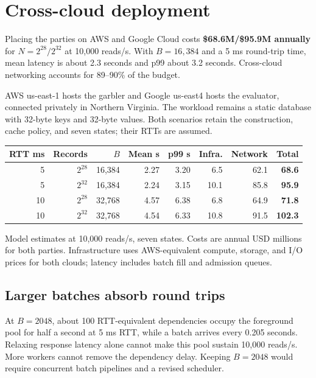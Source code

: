 \documentclass[11pt]{article}
\begin{document}
\clearpage
\section{Cross-cloud deployment}\label{sec:cross-cloud}
Placing the parties on AWS and Google Cloud costs \textbf{\$68.6M/\$95.9M annually} for $N=2^{28}/2^{32}$ at 10,000 reads/s. With $B=16{,}384$ and a 5 ms round-trip time, mean latency is about 2.3 seconds and p99 about 3.2 seconds. Cross-cloud networking accounts for 89--90\% of the budget.

AWS us-east-1 hosts the garbler and Google us-east4 hosts the evaluator,
connected privately in Northern Virginia. The workload remains a static
database with 32-byte keys and 32-byte values. Both scenarios retain the
construction, cache policy, and seven states; their RTTs are assumed.

\begin{center}\footnotesize
\begin{tabular}{rrrrrrrr}\toprule
RTT ms & Records & $B$ & Mean s & p99 s & Infra. & Network & Total\\\midrule
5 & $2^{28}$ & 16,384 & 2.27 & 3.20 & 6.5 & 62.1 & \textbf{68.6}\\
5 & $2^{32}$ & 16,384 & 2.24 & 3.15 & 10.1 & 85.8 & \textbf{95.9}\\
10 & $2^{28}$ & 32,768 & 4.57 & 6.38 & 6.8 & 64.9 & \textbf{71.8}\\
10 & $2^{32}$ & 32,768 & 4.54 & 6.33 & 10.8 & 91.5 & \textbf{102.3}\\
\bottomrule\end{tabular}\end{center}
{\footnotesize Model estimates at 10,000 reads/s, seven states. Costs are annual USD millions for both parties. Infrastructure uses AWS-equivalent compute, storage, and I/O prices for both clouds; latency includes batch fill and admission queues.\par}

\subsection{Larger batches absorb round trips}
At $B=2048$, about 100 RTT-equivalent dependencies occupy the foreground
pool for half a second at 5 ms RTT, while a batch arrives every 0.205 seconds.
Relaxing response latency alone cannot make this pool sustain 10,000 reads/s.
More workers cannot remove the dependency delay. Keeping $B=2048$ would
require concurrent batch pipelines and a revised scheduler.
\end{document}
